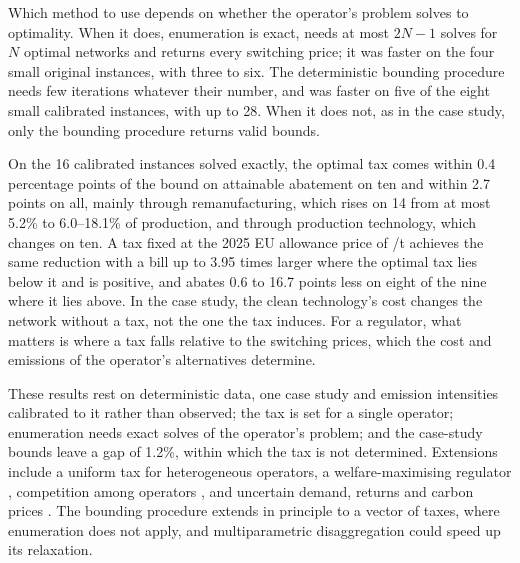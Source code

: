 \documentclass[review,11pt,nonatbib]{elsarticle}
\theoremstyle{remark}
\newcommand{\EUR}{\texteuro}
\begin{document}
Which method to use depends on whether the operator's problem solves to optimality. When it does, enumeration is exact, needs at most $2N-1$ solves for $N$ optimal networks and returns every switching price; it was faster on the four small original instances, with three to six. The deterministic bounding procedure needs few iterations whatever their number, and was faster on five of the eight small calibrated instances, with up to 28. When it does not, as in the case study, only the bounding procedure returns valid bounds.

On the 16 calibrated instances solved exactly, the optimal tax comes within 0.4 percentage points of the bound on attainable abatement on ten and within 2.7 points on all, mainly through remanufacturing, which rises on 14 from at most 5.2\% to 6.0--18.1\% of production, and through production technology, which changes on ten. A tax fixed at the 2025 EU allowance price of \EUR74/t achieves the same reduction with a bill up to 3.95 times larger where the optimal tax lies below it and is positive, and abates 0.6 to 16.7 points less on eight of the nine where it lies above. In the case study, the clean technology's cost changes the network without a tax, not the one the tax induces. For a regulator, what matters is where a tax falls relative to the switching prices, which the cost and emissions of the operator's alternatives determine.

These results rest on deterministic data, one case study and emission intensities calibrated to it rather than observed; the tax is set for a single operator; enumeration needs exact solves of the operator's problem; and the case-study bounds leave a gap of 1.2\%, within which the tax is not determined. Extensions include a uniform tax for heterogeneous operators, a welfare-maximising regulator \parencite{krass2013environmental,rustico2022environmental}, competition among operators \parencite{krass2025competitive}, and uncertain demand, returns and carbon prices \parencite{haddadsisakht2018closed,beck2023survey}. The bounding procedure extends in principle to a vector of taxes, where enumeration does not apply, and multiparametric disaggregation \parencite{kolodziej2013global} could speed up its relaxation.

\printbibliography
\end{document}
